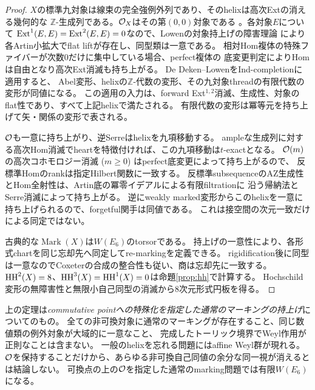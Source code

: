 \begin{proof}
$X$の標準九対象は線束の完全強例外列であり、そのhelixは高次Extの消える幾何的な
$\mathbb Z$-生成列である。$\mathcal O_X$はその第$(0,0)$対象である
\cite[(4.1), (9.44)]{AOU}。各対象$E$について
$\operatorname{Ext}^1(E,E)=\operatorname{Ext}^2(E,E)=0$なので、Lowenの対象持上げの障害理論\cite{Lowen}
により各Artin小拡大でflat liftが存在し、同型類は一意である。
相対Hom複体の特殊ファイバーが次数0だけに集中している場合、perfect複体の
底変更判定によりHomは自由となり高次Ext消滅も持ち上がる。
De Deken--Lowen\cite[Theorems 4.5, 5.13, 5.15]{DDL}をInd-completionに適用すると、
Abel変形、helixの$\mathbb Z$-代数の変形、その九対象threadの有限代数の変形が同値になる。
この適用の入力は、forward Ext$^{1,2}$消滅、生成性、対象のflat性であり、すべて上記helixで満たされる。
有限代数の変形は冪等元を持ち上げて矢・関係の変形で表される。

$\mathcal O$も一意に持ち上がり、逆Serreはhelixを九項移動する。
ampleな生成列に対する高次Hom消滅でheartを特徴付ければ、この九項移動は$t$-exactとなる。
$\mathcal O(m)$の高次コホモロジー消滅 ($m\ge0$) はperfect底変更によって持ち上がるので、
反標準Homのrankは指定Hilbert関数に一致する。
反標準subsequenceのAZ生成性とHom全射性は、Artin底の冪零イデアルによる有限filtrationに
沿う帰納法とSerre消滅によって持ち上がる。
逆にweakly marked変形からこのhelixを一意に持ち上げられるので、forgetful関手は同値である。
これは接空間の次元一致だけによる同定ではない。

古典的な$\operatorname{Mark}(X)$は$W(E_6)$のtorsorである\cite[\S2.3]{AOU}。
持上げの一意性により、各形式chartを同じ忘却先へ同定してre-markingを定義できる。
rigidification後に同型は一意なのでCoxeterの合成の整合性も従い、商は忘却先に一致する。
$\operatorname{HH}^2(X)=8$、$\operatorname{HH}^3(X)=\operatorname{HH}^1(X)=0$は命題\ref{prop:hh}で計算する。
Hochschild変形の無障害性と無限小自己同型の消滅から8次元形式円板を得る。
\end{proof}

\begin{remark}
上の定理は\emph{commutative pointへの特殊化を指定した通常のマーキングの持上げ}についてのもの。
全ての非可換対象に通常のマーキングが存在すること、同じ数値類の例外対象が大域的に一意なこと、
完成したトーリック境界でWeyl作用が正則なことは含まない。
一般のhelixを忘れる問題にはaffine Weyl群が現れる\cite{OWR}。
$\mathcal O$を保持することだけから、あらゆる非可換自己同値の余分な同一視が消えるとは結論しない。
可換点の上の$\mathcal O$を指定した通常のmarking問題では有限$W(E_6)$になる。
\end{remark}

